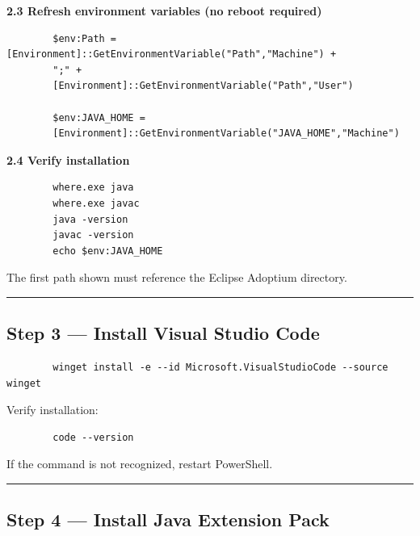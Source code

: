 \documentclass[11pt,a4paper]{article}
\begin{document}
	\vspace{4pt}
	
	\textbf{2.3 Refresh environment variables (no reboot required)}
	
	\begin{lstlisting}
		$env:Path = [Environment]::GetEnvironmentVariable("Path","Machine") +
		";" +
		[Environment]::GetEnvironmentVariable("Path","User")
		
		$env:JAVA_HOME =
		[Environment]::GetEnvironmentVariable("JAVA_HOME","Machine")
	\end{lstlisting}
	
	\vspace{4pt}
	
	\textbf{2.4 Verify installation}
	
	\begin{lstlisting}
		where.exe java
		where.exe javac
		java -version
		javac -version
		echo $env:JAVA_HOME
	\end{lstlisting}
	
	The first path shown must reference the Eclipse Adoptium directory.
	
	\vspace{6pt}
	\hrule
	\vspace{10pt}
	
	\subsection*{Step 3 — Install Visual Studio Code}
	
	\begin{lstlisting}
		winget install -e --id Microsoft.VisualStudioCode --source winget
	\end{lstlisting}
	
	Verify installation:
	
	\begin{lstlisting}
		code --version
	\end{lstlisting}
	
	If the command is not recognized, restart PowerShell.
	
	\vspace{6pt}
	\hrule
	\vspace{10pt}
	
	\subsection*{Step 4 — Install Java Extension Pack}
	
\end{document}

